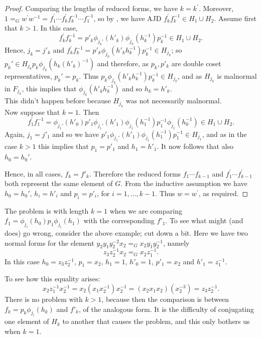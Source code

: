 \documentclass[a4paper,12pt]{article}
\numberwithin{equation}{section}
\numberwithin{figure}{section}
\newenvironment{ajd1}{\noindent\color{red} AJD }{}
\newcommand{\ajd}[1]{\begin{ajd1} #1 \end{ajd1}}
\begin{document}
\begin{proof}
Comparing the lengths of reduced forms, we have $k=k^\prime$.
Moreover, $1=_G w^\prime w^{-1}= f_1^\prime \cdots f_{k}^\prime
f_k^{-1}\cdots f_1^{-1}$, so by \cite[Chapter IV, Theorem 2.6]{LS}, 
we have \ajd{$ f_{k}^\prime f_k^{-1}\in H_{1}\cup H_2$.
Assume first that $k>1$. 
In this case, 
\[ f_{k}^\prime f_k^{-1}= p'_k\phi_{j_k'}(h'_k)\phi_{j_k}(h_k^{-1})p_k^{-1}\in H_1\cup H_2.\] 
 Hence, $j_k=j'_k$ and 
$f_{k}^\prime f_k^{-1}=
p'_k\phi_{j_k}(h'_k h_k^{-1})p_k^{-1}\in H_{j_k}$; 
so $p_k'\in H_{j_k}p_k\phi_{j_k}(h_k (h'_k)^{-1})$ and therefore, as 
$p_k, p'_k$ are  double coset representatives,  
$p_k'=p_k$. 
Thus $p_k\phi_{j_k}(h'_k h_k^{-1})p_k^{-1}\in H_{j_k}$, and as 
$H_{j_k}$ is malnormal in $F_{j_k}$, this implies that
$\phi_{j_k}(h'_k h_k^{-1})$ and so $h_k=h'_k$.\\
This didn't happen before because $H_{j_k}$ was not 
necessarily malnormal.\\
Now suppose that $k=1$. Then 
\[
f_{1}^\prime f_1^{-1}=\phi_{j_1'}(h'_0) p'_1\phi_{j_1'}(h'_1)
\phi_{j_1}(h_1^{-1})p_1^{-1}\phi_{j_1}(h_0^{-1})\in H_1\cup H_2.
\] 
Again, $j_1=j'_1$ and so we
 have $p'_1\phi_{j_1'}(h'_1)\phi_{j_1}(h_1^{-1})p_1^{-1}
\in H_{j_1}$, 
and as in the case $k>1$ this implies that $p_1=p'_1$ and 
$h_1=h'_1$. It now follows that also $h_0=h_0'$. 
 
Hence, in all cases, $f_k=f'_k$. 
Therefore the reduced forms 
$f_1\cdots f_{k-1}$ and 
$f_1^\prime \cdots f_{k-1}^\prime$ both represent the same 
element of $G$. From the inductive assumption we have 
$h_0=h_0'$,  $h_i=h'_i$ and $p_i=p'_i$, for $i=1,\ldots, k-1$. 
Thus }
   $w=w^\prime$, as required.
\end{proof}

The problem is with length $k=1$ when we are comparing 
$f_1=\phi_{j_i}(h_0)p_1\phi_{j_i}(h_1)$ with the corresponding $f'_1$. 
To see what might (and does) go wrong, consider the above example; cut down
a bit. 
Here we have two normal forms for the element
 $y_2y_1y_2^{-2}x_2=_Gx_2y_1y_2^{-1}$, namely
\[z_3z_2^{-1}x_2=_G x_2z_1^{-1}.\]
In this case $h_0=z_3z_2^{-1}$, $p_1=x_2$, $h_1=1$, $h'_0=1$, $p'_1=x_2$ and 
$h'_1=z_1^{-1}$. 

To see how this equality arises:
\[x_2z_1^{-1}x_2^{-1}=x_2(x_1x_2^{-1})x_2^{-1}=(x_2x_1x_2)(x_2^{-3})=z_3z_2^{-1}.\]
There is no problem with $k>1$, because then the comparison is between
$f_k=p_k\phi_{j_i}(h_k)$ and $f'_k$, of the analogous form. It is the 
difficulty of conjugating one element of $H_k$ to another that causes
the problem, and this only bothers us when $k=1$. 
\end{document}
